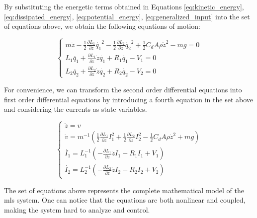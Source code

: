 By substituting the energetic terms obtained in Equations \ref{eq:kinetic_energy}, \ref{eq:dissipated_energy}, \ref{eq:potential_energy}, \ref{eq:generalized_input} into the set of equations above, we obtain the following equations of motion:

\begin{equation}
    \begin{cases}
        m \ddot{z} - \frac{1}{2} \frac{\partial L_1}{\partial z} \dot{q_1}^2 - \frac{1}{2} \frac{\partial L_2}{\partial z} \dot{q_2}^2 + \frac{1}{2} C_d A \rho \dot{z}^2 - m g = 0 \\
        L_1 \ddot{q_1} + \frac{\partial L_1}{\partial z} \dot{z} \dot{q_1} + R_1 \dot{q_1} - V_1 = 0                                                                                \\
        L_2 \ddot{q_2} + \frac{\partial L_2}{\partial z} \dot{z} \dot{q_2} + R_2 \dot{q_2} - V_2 = 0
    \end{cases}
\end{equation}

For convenience, we can transform the second order differential equations into first order differential equations by introducing a fourth equation in the set above and considering the currents as state variables.

\begin{equation}
    \begin{cases}
        \dot{z} = v                                                                                                                                                                    \\
        \dot{v} = m^{-1} \left(\frac{1}{2} \frac{\partial L_1}{\partial z} I_1^2 + \frac{1}{2} \frac{\partial L_2}{\partial z} I_2^2 - \frac{1}{2} C_d A \rho \dot{z}^2 + m g  \right) \\
        \dot{I_1} = L_1^{-1} \left(- \frac{\partial L_1}{\partial z} \dot{z} I_1 - R_1 I_1 + V_1 \right)                                                                               \\
        \dot{I_2} = L_2^{-1} \left(- \frac{\partial L_2}{\partial z} \dot{z} I_2 - R_2 I_2 + V_2 \right)
    \end{cases}
    \label{eq:equations_of_motion_full}
\end{equation}

The set of equations above represents the complete mathematical model of the \acrshort{mls} system.
One can notice that the equations are both nonlinear and coupled, making the system hard to analyze and control.

